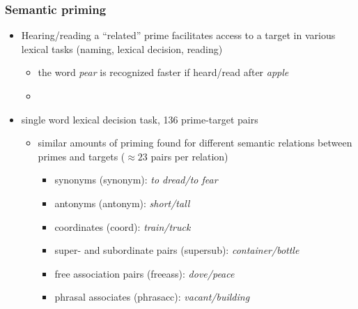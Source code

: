 \documentclass[t]{beamer} %
\begin{document}
\begin{frame}
  \frametitle{Semantic priming}
  \begin{itemize}
  \item Hearing/reading a ``related'' prime facilitates access to a
    target in various lexical tasks (naming, lexical decision,
    reading)
    \begin{itemize}
  \item the word \emph{pear} is recognized faster if heard/read after \emph{apple}
  \item[]
    \end{itemize}
  \item<2-> \citet{Hodgson:91} single word lexical decision task, 136
    prime-target pairs \citep[cf.][]{Pado:Lapata:07}
    \begin{itemize}
  \item similar amounts of priming found for different  semantic relations between primes and targets ($\approx 23$ pairs
    per relation)
    \begin{itemize}
    \item synonyms (synonym): \emph{to dread/to fear}
    \item antonyms (antonym): \emph{short/tall}
    \item coordinates (coord): \emph{train/truck}
    \item super- and subordinate pairs (supersub): \emph{container/bottle}
    \item free association pairs (freeass): \emph{dove/peace}
    \item phrasal associates (phrasacc): \emph{vacant/building}
    \end{itemize}
  \end{itemize}
\end{itemize}
\end{frame}
\end{document}
